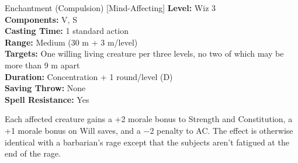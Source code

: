 {Enchantment (Compulsion) [Mind-Affecting]}
{
	\textbf{Level:}
	Wiz 3\\
	\textbf{Components:}
	V, S\\
	\textbf{Casting Time:}
	1 standard action\\
	\textbf{Range:}
	Medium (30 m + 3 m/level)\\
	\textbf{Targets:}
	One willing living creature per three levels, no two of which may be more than 9 m apart\\
	\textbf{Duration:}
	Concentration + 1 round/level (D)\\
	\textbf{Saving Throw:}
	None\\
	\textbf{Spell Resistance:}
	Yes\\
}
{
	Each affected creature gains a +2 morale bonus to Strength and Constitution, a +1 morale bonus on Will saves, and a $-2$ penalty to AC. The effect is otherwise identical with a barbarian's rage except that the subjects aren't fatigued at the end of the rage.

}
